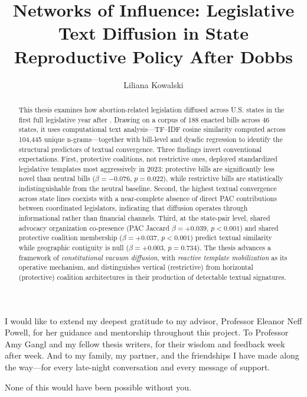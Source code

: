 \documentclass[12pt]{report}
\title{Networks of Influence: Legislative Text Diffusion in State Reproductive Policy After Dobbs}
\author{Liliana Kowalski}
\begin{document}
\maketitle

\begin{abstract}
This thesis examines how abortion-related legislation diffused across U.S. states in the first full legislative year after \textcite{DobbsJacksonWomens2021}. Drawing on a corpus of 188 enacted bills across 46 states, it uses computational text analysis---TF--IDF cosine similarity computed across 104{,}445 unique n-grams---together with bill-level and dyadic regression to identify the structural predictors of textual convergence. Three findings invert conventional expectations. First, protective coalitions, not restrictive ones, deployed standardized legislative templates most aggressively in 2023: protective bills are significantly less novel than neutral bills ($\beta = -0.076$, $p = 0.022$), while restrictive bills are statistically indistinguishable from the neutral baseline. Second, the highest textual convergence across state lines coexists with a near-complete absence of direct PAC contributions between coordinated legislators, indicating that diffusion operates through informational rather than financial channels. Third, at the state-pair level, shared advocacy organization co-presence (PAC Jaccard $\beta = +0.039$, $p < 0.001$) and shared protective coalition membership ($\beta = +0.037$, $p < 0.001$) predict textual similarity while geographic contiguity is null ($\beta = +0.003$, $p = 0.734$). The thesis advances a framework of \emph{constitutional vacuum diffusion}, with \emph{reactive template mobilization} as its operative mechanism, and distinguishes vertical (restrictive) from horizontal (protective) coalition architectures in their production of detectable textual signatures.
\end{abstract}

\begin{center}
I would like to extend my deepest gratitude to my advisor, Professor Eleanor Neff Powell, for her guidance and mentorship throughout this project. To Professor Amy Gangl and my fellow thesis writers, for their wisdom and feedback week after week. And to my family, my partner, and the
friendships I have made along the way---for every late-night conversation
and every message of support.

None of this would have been possible without you.
\end{center}
\end{document}

